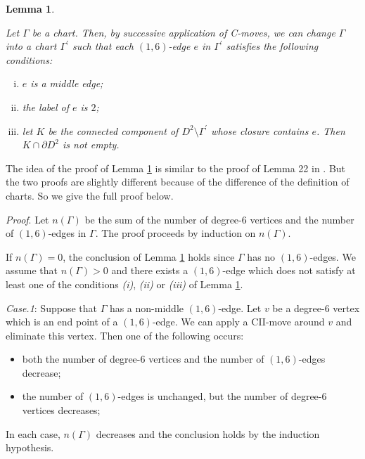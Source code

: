 \documentclass{amsart}
\theoremstyle{plain}
\newtheorem{lem}[thm]{Lemma}
\theoremstyle{definition}
\begin{document}
\begin{lem}\label{about(1,6)}

Let $\Gamma$ be a chart. 
Then, by successive application of C-moves, 
we can change $\Gamma$ into a chart $\Gamma^\prime$ such that each $(1,6)$-edge $e$ in $\Gamma^\prime$ satisfies the following conditions: 

\begin{enumerate}[(i)]
\item $e$ is a middle edge; 

\item the label of $e$ is $2$; 

\item let $K$ be the connected component of $D^2\setminus\Gamma^\prime$ whose closure contains $e$. 
Then $K\cap\partial D^2$ is not empty. 

\end{enumerate}

\end{lem}

The idea of the proof of Lemma \ref{about(1,6)} is similar to the proof of Lemma 22 in \cite{KMMW}. 
But the two proofs are slightly different because of the difference of the definition of charts. 
So we give the full proof below. 
\\
\par

{\it Proof}. 
Let $n(\Gamma)$ be the sum of the number of degree-$6$ vertices and the number of $(1,6)$-edges in $\Gamma$. 
The proof proceeds by induction on $n(\Gamma)$. 

\par

If $n(\Gamma)=0$, the conclusion of Lemma \ref{about(1,6)} holds since $\Gamma$ has no $(1,6)$-edges. 
We assume that $n(\Gamma)>0$ and there exists a $(1,6)$-edge which does not satisfy at least one of the conditions {\it (i)}, {\it (ii)} or {\it (iii)} of Lemma \ref{about(1,6)}. 

\par

{\it Case.1}: Suppose that $\Gamma$ has a non-middle $(1,6)$-edge. 
Let $v$ be a degree-$6$ vertex which is an end point of a $(1,6)$-edge. 
We can apply a CII-move around $v$ and eliminate this vertex. 
Then one of the following occurs: 

\begin{itemize}

\item both the number of degree-$6$ vertices and the number of $(1,6)$-edges decrease; 

\item the number of $(1,6)$-edges is unchanged, but the number of degree-$6$ vertices decreases; 

\end{itemize}
\noindent
In each case, $n(\Gamma)$ decreases and the conclusion holds by the induction hypothesis. 
\end{document}
